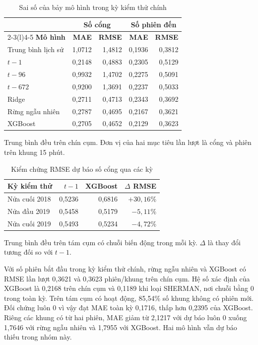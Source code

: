 \documentclass[conference,a4paper]{IEEEtran}
\begin{document}
\begin{table}[!t]
\caption{Sai số của bảy mô hình trong kỳ kiểm thử chính}
\label{tab:forecast_comparison}
\centering\footnotesize
\setlength{\tabcolsep}{3pt}
\begin{tabularx}{\columnwidth}{@{}Xrrrr@{}}
\toprule
& \multicolumn{2}{c}{\textbf{Số cổng}} & \multicolumn{2}{c}{\textbf{Số phiên đến}} \\
\cmidrule(lr){2-3}\cmidrule(l){4-5}
\textbf{Mô hình} & \textbf{MAE} & \textbf{RMSE} & \textbf{MAE} & \textbf{RMSE} \\
\midrule
Trung bình lịch sử & 1,0712 & 1,4812 & 0,1936 & 0,3812 \\
$t-1$ & 0,2148 & 0,4883 & 0,2305 & 0,5129 \\
$t-96$ & 0,9932 & 1,4702 & 0,2275 & 0,5091 \\
$t-672$ & 0,9200 & 1,3691 & 0,2237 & 0,5033 \\
Ridge & 0,2711 & 0,4713 & 0,2343 & 0,3692 \\
Rừng ngẫu nhiên & 0,2787 & 0,4695 & 0,2167 & 0,3621 \\
XGBoost & 0,2705 & 0,4652 & 0,2129 & 0,3623 \\
\bottomrule
\end{tabularx}
\par\smallskip
\raggedright\scriptsize Trung bình đều trên chín cụm. Đơn vị của hai mục tiêu lần lượt là cổng và phiên trên khung 15 phút.
\end{table}

\begin{table}[!t]
\caption{Kiểm chứng RMSE dự báo số cổng qua các kỳ}
\label{tab:forecast_windows}
\centering\footnotesize
\begin{tabularx}{\columnwidth}{@{}Xrrr@{}}
\toprule
\textbf{Kỳ kiểm thử} & \textbf{$t-1$} & \textbf{XGBoost} & \textbf{$\Delta$ RMSE} \\
\midrule
Nửa cuối 2018 & 0,5236 & 0,6816 & $+30{,}16$\% \\
Nửa đầu 2019 & 0,5458 & 0,5179 & $-5{,}11$\% \\
Nửa cuối 2019 & 0,5493 & 0,5234 & $-4{,}72$\% \\
\bottomrule
\end{tabularx}
\par\smallskip
\raggedright\scriptsize Trung bình đều trên tám cụm có chuỗi biến động trong mỗi kỳ. $\Delta$ là thay đổi tương đối so với $t-1$.
\end{table}

Với số phiên bắt đầu trong kỳ kiểm thử chính, rừng ngẫu nhiên và XGBoost có RMSE lần lượt 0,3621 và 0,3623 phiên/khung trên chín cụm. Hệ số xác định của XGBoost là 0,2168 trên chín cụm và 0,1189 khi loại SHERMAN, nơi chuỗi bằng 0 trong toàn kỳ. Trên tám cụm có hoạt động, 85,54\% số khung không có phiên mới. Đối chứng luôn 0 vì vậy đạt MAE toàn kỳ 0,1716, thấp hơn 0,2395 của XGBoost. Riêng các khung có từ hai phiên, MAE giảm từ 2,1217 với dự báo luôn 0 xuống 1,7646 với rừng ngẫu nhiên và 1,7955 với XGBoost. Hai mô hình vẫn dự báo thiếu trong nhóm này.
\end{document}
